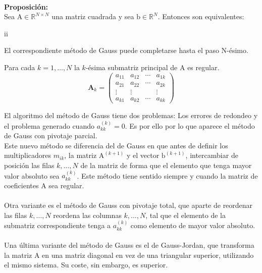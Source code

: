 \documentclass{article}
\begin{document}
\hrulefill
\\
\textbf{Proposición:}
\\
Sea $\text{A}\in\mathbb{R}^{N\times N}$ una matriz cuadrada y sea $\text{b}\in\mathbb{R}^N$. Entonces son equivalentes:
\begin{labeling}{ii}
\item [(i)]El correspondiente método de Gauss puede completarse hasta el paso N-ésimo.
\item [(ii)]Para cada $k=1,\dots,N$ la $k$-ésima submatriz principal de A es regular.
$$\textbf{A}_k=\begin{pmatrix}
a_{11} & a_{12} & \cdots & a_{1k} \\
a_{21} & a_{22} & \cdots & a_{2k} \\
\vdots & \vdots & & \vdots \\
a_{k1} & a_{k2} & \cdots & a_{kk}
\end{pmatrix}$$
\end{labeling}
El algoritmo del método de Gauss tiene dos problemas: Los errores de redondeo y el problema generado cuando $a_{kk}^{(k)}=0$. Es por ello por lo que aparece el método de Gauss con pivotaje parcial.
\\
Este nuevo método se diferencia del de Gauss en que antes de definir los multiplicadores $m_{ik}$, la matriz $\text{A}^{(k+1)}$ y el vector $\text{b}^{(k+1)}$, intercambiar de posición las filas $k,\dots,N$ de la matriz de forma que el elemento que tenga mayor valor absoluto sea $a_{kk}^{(k)}$. Este método tiene sentido siempre y cuando la matriz de coeficientes A sea regular.
\\
\\
Otra variante es el método de Gauss con pivotaje total, que aparte de reordenar las filas $k,\dots,N$ reordena las columnas $k,\dots,N$, tal que el elemento de la submatriz correspondiente tenga a $a_{kk}^{(k)}$ como elemento de mayor valor absoluto.
\\
\\
Una última variante del método de Gauss es el de Gauss-Jordan, que transforma la matriz A en una matriz diagonal en vez de una triangular superior, utilizando el mismo sistema. Su coste, sin embargo, es superior.
%
%
\end{document}
